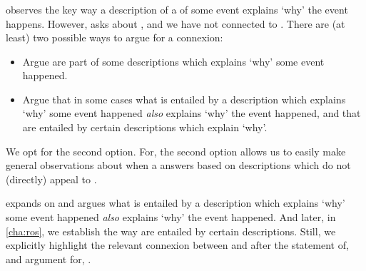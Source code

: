 \subsubsection{\progExII{}}


\begin{note}
  \progExI{} observes the key way a description of a \se{} of some event explains `why' the event happens.
  However, \qWhy{} asks about , and we have not connected  to .
  There are (at least) two possible ways to argue for a connexion:
  \begin{itemize}
  \item
    Argue  are part of some descriptions which explains `why' some event happened.
  \item
    Argue that in some cases what is entailed by a description which explains `why' some event happened \emph{also} explains `why' the event happened, and that  are entailed by certain descriptions which explain `why'.
  \end{itemize}
  We opt for the second option.
  For, the second option allows us to easily make general observations about when a \fingfr{} answers \qWhy{} based on descriptions which do not (directly) appeal to .

  \progExII{} expands on \progExI{} and argues what is entailed by a description which explains `why' some event happened \emph{also} explains `why' the event happened.
  And later, in \autoref{cha:ros}, we establish the way  are entailed by certain descriptions.
  Still, we explicitly highlight the relevant connexion between \progExII{} and \fingfr{} after the statement of, and argument for, \progExII{}.
\end{note}


